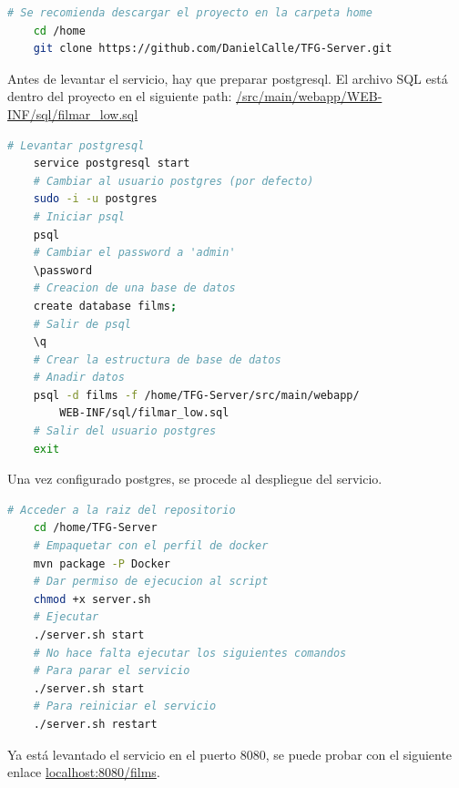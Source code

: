 \begin{lstlisting}[language=bash, caption=Descarga del proyecto]
    # Se recomienda descargar el proyecto en la carpeta home
    cd /home
    git clone https://github.com/DanielCalle/TFG-Server.git
\end{lstlisting}

Antes de levantar el servicio, hay que preparar postgresql. El archivo SQL está dentro del proyecto
en el siguiente path: \url{/src/main/webapp/WEB-INF/sql/filmar_low.sql}

\begin{lstlisting}[language=bash, caption=Configuración postgresql]
    # Levantar postgresql
    service postgresql start
    # Cambiar al usuario postgres (por defecto)
    sudo -i -u postgres
    # Iniciar psql
    psql
    # Cambiar el password a 'admin'
    \password
    # Creacion de una base de datos
    create database films;
    # Salir de psql
    \q
    # Crear la estructura de base de datos
    # Anadir datos
    psql -d films -f /home/TFG-Server/src/main/webapp/
        WEB-INF/sql/filmar_low.sql
    # Salir del usuario postgres
    exit
\end{lstlisting}

Una vez configurado postgres, se procede al despliegue del servicio.

\begin{lstlisting}[language=bash, caption=Despliegue]
    # Acceder a la raiz del repositorio
    cd /home/TFG-Server
    # Empaquetar con el perfil de docker
    mvn package -P Docker
    # Dar permiso de ejecucion al script
    chmod +x server.sh
    # Ejecutar 
    ./server.sh start
    # No hace falta ejecutar los siguientes comandos
    # Para parar el servicio
    ./server.sh start
    # Para reiniciar el servicio
    ./server.sh restart
\end{lstlisting}

Ya está levantado el servicio en el puerto 8080, se puede probar con el siguiente enlace
\url{localhost:8080/films}.

